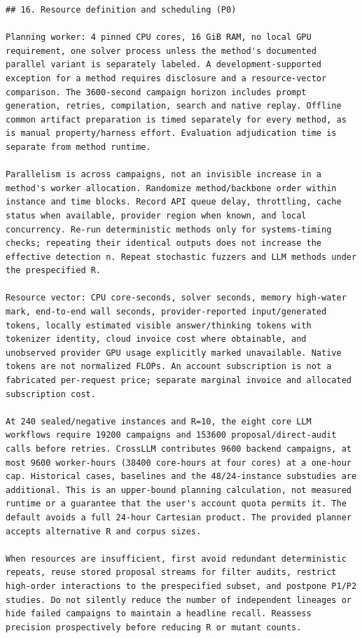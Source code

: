 \documentclass[11pt,a4paper]{article}
\begin{document}
\begin{verbatim}
## 16. Resource definition and scheduling (P0)

Planning worker: 4 pinned CPU cores, 16 GiB RAM, no local GPU requirement, one solver process unless the method's documented parallel variant is separately labeled. A development-supported exception for a method requires disclosure and a resource-vector comparison. The 3600-second campaign horizon includes prompt generation, retries, compilation, search and native replay. Offline common artifact preparation is timed separately for every method, as is manual property/harness effort. Evaluation adjudication time is separate from method runtime.

Parallelism is across campaigns, not an invisible increase in a method's worker allocation. Randomize method/backbone order within instance and time blocks. Record API queue delay, throttling, cache status when available, provider region when known, and local concurrency. Re-run deterministic methods only for systems-timing checks; repeating their identical outputs does not increase the effective detection n. Repeat stochastic fuzzers and LLM methods under the prespecified R.

Resource vector: CPU core-seconds, solver seconds, memory high-water mark, end-to-end wall seconds, provider-reported input/generated tokens, locally estimated visible answer/thinking tokens with tokenizer identity, cloud invoice cost where obtainable, and unobserved provider GPU usage explicitly marked unavailable. Native tokens are not normalized FLOPs. An account subscription is not a fabricated per-request price; separate marginal invoice and allocated subscription cost.

At 240 sealed/negative instances and R=10, the eight core LLM workflows require 19200 campaigns and 153600 proposal/direct-audit calls before retries. CrossLLM contributes 9600 backend campaigns, at most 9600 worker-hours (38400 core-hours at four cores) at a one-hour cap. Historical cases, baselines and the 48/24-instance substudies are additional. This is an upper-bound planning calculation, not measured runtime or a guarantee that the user's account quota permits it. The default avoids a full 24-hour Cartesian product. The provided planner accepts alternative R and corpus sizes.

When resources are insufficient, first avoid redundant deterministic repeats, reuse stored proposal streams for filter audits, restrict high-order interactions to the prespecified subset, and postpone P1/P2 studies. Do not silently reduce the number of independent lineages or hide failed campaigns to maintain a headline recall. Reassess precision prospectively before reducing R or mutant counts.


\end{verbatim}
\end{document}
